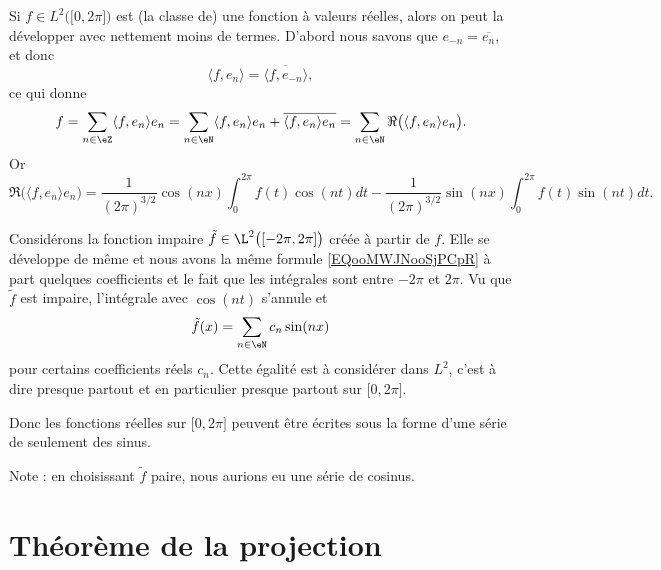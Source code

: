 \begin{example}     \label{EXooQDWUooLtuIOm}
    Si \( f\in L^2\big( \mathopen[ 0 , 2\pi \mathclose] \big)\) est (la classe de) une fonction à valeurs réelles, alors on peut la développer avec nettement moins de termes. D'abord nous savons que \( e_{-n}=\overline{ e_n }\), et donc
    \begin{equation}
        \langle f, e_n\rangle =\overline{ \langle f, e_{-n}\rangle  },
    \end{equation}
    ce qui donne
    \begin{equation}
        f=\sum_{n\in\eZ}\langle f, e_n\rangle e_n=\sum_{n\in \eN}\langle f, e_n\rangle e_n +\overline{ \langle f, e_n\rangle e_n }=\sum_{n\in \eN}\Re\big( \langle f, e_n\rangle e_n \big).
    \end{equation}
    Or
    \begin{equation}        \label{EQooMWJNooSjPCpR}
        \Re\big( \langle f, e_n\rangle e_n \big)=\frac{1}{ (2\pi)^{3/2} }\cos(nx)\int_0^{2\pi}f(t)\cos(nt)dt-\frac{1}{ (2\pi)^{3/2} }\sin(nx)\int_0^{2\pi}f(t)\sin(nt)dt.
    \end{equation}

    Considérons la fonction impaire \( \tilde f\in\L^2\big( [-2\pi,2\pi] \big)\) créée à partir de \( f\). Elle se développe de même et nous avons la même formule \eqref{EQooMWJNooSjPCpR} à part quelques coefficients et le fait que les intégrales sont entre \( -2\pi\) et \( 2\pi\). Vu que \( \tilde f\) est impaire, l'intégrale avec \( \cos(nt)\) s'annule et
    \begin{equation}
        \tilde f(x)=\sum_{n\in \eN}c_n\sin(nx)
    \end{equation}
    pour certains coefficients réels \( c_n\). Cette égalité est à considérer dans \( L^2\), c'est à dire presque partout et en particulier presque partout sur \( \mathopen[ 0 , 2\pi \mathclose]\).

    Donc les fonctions réelles sur \( \mathopen[ 0 , 2\pi \mathclose]\) peuvent être écrites sous la forme d'une série de seulement des sinus.

    Note : en choisissant \( \tilde f\) paire, nous aurions eu une série de cosinus.
\end{example}

\section{Théorème de la projection}


